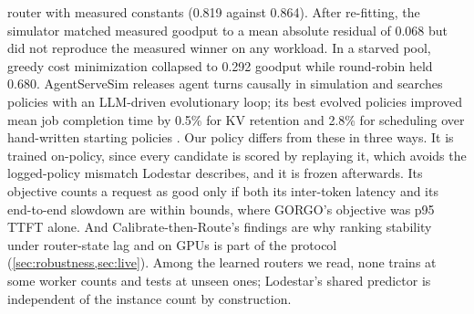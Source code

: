 router with measured constants (0.819 against 0.864). After re-fitting, the simulator matched
measured goodput to a mean absolute residual of 0.068 but did not reproduce the measured winner
on any workload. In a starved pool, greedy cost minimization collapsed to 0.292 goodput while
round-robin held 0.680.
AgentServeSim releases agent turns causally in simulation and searches policies with an
LLM-driven evolutionary loop; its best evolved policies improved mean job completion time by
0.5\% for KV retention and 2.8\% for scheduling over hand-written starting policies
\citep{rajib2026agentservesim}.
Our policy differs from these in three ways. It is trained on-policy, since every candidate is
scored by replaying it, which avoids the logged-policy mismatch Lodestar describes, and it is
frozen afterwards. Its objective counts a request as good only if both its inter-token latency
and its end-to-end slowdown are within bounds, where GORGO's objective was p95 TTFT alone. And
Calibrate-then-Route's findings are why ranking
stability under router-state lag and on GPUs is part of the protocol
(\cref{sec:robustness,sec:live}).
Among the learned routers we read, none trains at some worker counts and tests at unseen ones;
Lodestar's shared predictor is independent of the instance count by construction.

